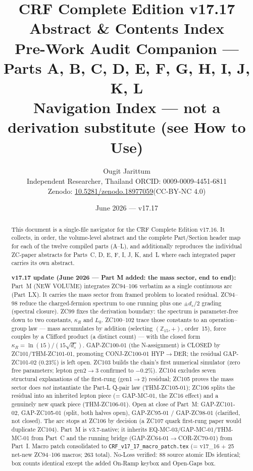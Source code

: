 \documentclass[11pt, a4paper]{article}
\title{%
  \textbf{\color{deepblue}CRF Complete Edition v17.17}\\[0.3em]
  \large Abstract \& Contents Index\\[0.4em]
  \normalsize\color{mutedgray}
  Pre-Work Audit Companion --- Parts A, B, C, D, E, F, G, H, I, J, K, L\\[0.2em]
  \footnotesize\color{crfgreen}
  Navigation Index --- not a derivation substitute (see How to Use)
}
\author{Ougit Jarittum\\
  \small Independent Researcher, Thailand\quad
  ORCID: 0009-0009-4451-6811\\
  \small Zenodo: \href{https://doi.org/10.5281/zenodo.18977059}%
  {10.5281/zenodo.18977059}\quad (CC-BY-NC 4.0)
}
\date{June 2026 --- v17.17}
\begin{document}
\sloppy

\maketitle

\begin{abstract}
\sloppy
This document is a single-file navigator for the CRF Complete Edition
v17.16. It collects, in order, the volume-level abstract and the
complete Part/Section header map for each of the twelve compiled parts
(A--L), and additionally reproduces the individual ZC-paper
abstracts for Parts~C, D, E, F, I, J, K, and~L where each integrated paper
carries its own abstract.

\textbf{v17.17 update (June 2026 --- Part M added: the mass sector,
end to end):}
Part~M (NEW VOLUME) integrates ZC94--106 verbatim as a single continuous arc
(Part~LX). It carries the mass sector from framed problem to located residual.
ZC94--98 reduce the charged-fermion spectrum to one running plus one
$\pm d_s/2$ grading (spectral closure). ZC99 fixes the derivation boundary:
the spectrum is parameter-free down to two constants, $\kappa_R$ and $L_0$.
ZC100--102 trace those constants to an operation--group law --- mass
accumulates by addition (selecting $(\mathbb{Z}_{15},+)$, order~15), force
couples by a Clifford product (a distinct count) --- with the closed form
$\kappa_R=\ln(15)/(15\sqrt{d_s})$. GAP-ZC100-01 (the N-assignment) is CLOSED
by ZC101/THM-ZC101-01, promoting CONJ-ZC100-01 HYP$\to$DER; the residual
GAP-ZC101-02 ($0.23\%$) is left open. ZC103 builds the chain's first
numerical simulator (zero free parameters; lepton gen2$\to$3 confirmed to
$-0.2\%$). ZC104 excludes seven structural explanations of the first-rung
(gen1$\to$2) residual; ZC105 proves the mass sector does \emph{not}
instantiate the Part-L Q-pair law (THM-ZC105-01); ZC106 splits the residual
into an inherited lepton piece (= GAP-MC-01, the ZC16 effect) and a
genuinely new quark piece (THM-ZC106-01). Open at close of Part~M:
GAP-ZC101-02, GAP-ZC105-01 (split, both halves open), GAP-ZC95-01 /
GAP-ZC98-01 (clarified, not closed). The arc stops at ZC106 by decision
(a ZC107 quark first-rung paper would duplicate ZC104). Part~M is v3.7-native;
it inherits EQ-MC-03/GAP-MC-01/THM-MC-01 from Part~C and the running bridge
(GAP-ZC64-01$\to$COR-ZC70-01) from Part~I. Macro patch consolidated to
\texttt{CRF\_v17\_17\_macro\_patch.tex} (= v17\_16 + 25 net-new ZC94--106
macros; 263 total). No-Loss verified: 88 source atomic IDs identical; box
counts identical except the added On-Ramp keybox and Open-Gaps box.


\end{abstract}
\end{document}
